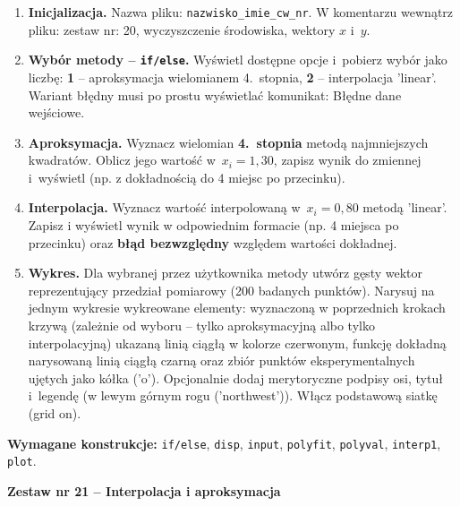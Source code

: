 \documentclass[a4paper,11pt]{article}
\begin{document}
\begin{enumerate}[leftmargin=*, label=\textbf{\arabic*.}, itemsep=2pt]

  \item \textbf{Inicjalizacja.}
    Nazwa pliku: \texttt{nazwisko\_imie\_cw\_nr}. W komentarzu wewnątrz pliku: zestaw nr: 20, wyczyszczenie środowiska, wektory $x$ i~$y$.

  \item \textbf{Wybór metody -- \texttt{if/else}.}
    Wyświetl dostępne opcje i~pobierz wybór jako liczbę: \textbf{1} -- aproksymacja wielomianem 4.~stopnia, \textbf{2} -- interpolacja 'linear'. Wariant błędny musi po prostu wyświetlać komunikat: Błędne dane wejściowe.

  \item \textbf{Aproksymacja.}
    Wyznacz wielomian \textbf{4.~stopnia} metodą najmniejszych kwadratów. Oblicz jego wartość w~$x_i = 1{,}30$, zapisz wynik do zmiennej i~wyświetl (np. z dokładnością do 4 miejsc po przecinku).

  \item \textbf{Interpolacja.}
    Wyznacz wartość interpolowaną w~$x_i = 0{,}80$ metodą 'linear'. Zapisz i wyświetl wynik w odpowiednim formacie (np. 4 miejsca po przecinku) oraz \textbf{błąd bezwzględny} względem wartości dokładnej.

  \item \textbf{Wykres.}
    Dla wybranej przez użytkownika metody utwórz gęsty wektor reprezentujący przedział pomiarowy (200 badanych punktów). Narysuj na jednym wykresie wykreowane elementy: wyznaczoną w poprzednich krokach krzywą (zależnie od wyboru -- tylko aproksymacyjną albo tylko interpolacyjną) ukazaną linią ciągłą w kolorze czerwonym, funkcję dokładną narysowaną linią ciągłą czarną oraz zbiór punktów eksperymentalnych ujętych jako kółka ('o'). Opcjonalnie dodaj merytoryczne podpisy osi, tytuł i~legendę (w lewym górnym rogu ('northwest')). Włącz podstawową siatkę (grid on).

\end{enumerate}

\vspace{0.3cm}
\begin{ramka}
\textbf{Wymagane konstrukcje:}
\texttt{if/else}, \texttt{disp}, \texttt{input}, \texttt{polyfit}, \texttt{polyval}, \texttt{interp1}, \texttt{plot}.
\end{ramka}

\clearpage
\begin{center}
  {\large\bfseries Zestaw nr 21 \quad -- \quad Interpolacja i aproksymacja}
\end{center}
\hrulefill
\vspace{0.4cm}
\end{document}
